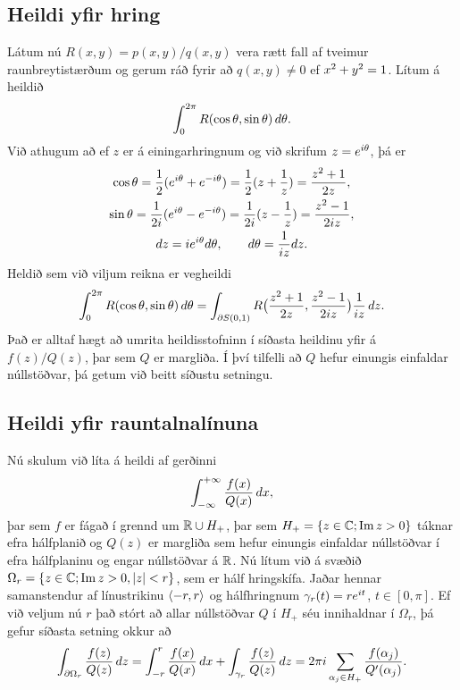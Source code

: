 \subsection*{Heildi yfir hring}

Látum nú $R(x,y)=p(x,y)/q(x,y)$ vera rætt fall af tveimur
raunbreytistærð\-um og gerum ráð fyrir að $q(x,y)\neq 0$ ef $x\sp
2+y\sp 2=1$.  Lítum á heildið 
 \begin{equation*}\int_0\sp{2\pi} R(\cos\theta,\sin \theta) \, d\theta.\label{10.2.11}
 \end{equation*}
Við athugum að ef $z$  er á einingarhringnum og við skrifum
$z=e\sp{i\theta}$, þá er 
\begin{gather*}
\cos\theta=\dfrac 12(e\sp{i\theta}+e\sp{-i\theta})
=\dfrac12(z+\dfrac 1z)=\dfrac{z\sp 2+1}{2z},\label{10.2.12}\\ 
\sin\theta=\dfrac 1{2i}(e\sp{i\theta}-e\sp{-i\theta})
=\dfrac1{2i}(z-\dfrac 1z)=\dfrac{z\sp 2-1}{2iz},\label{10.2.13}\\ 
dz=ie\sp{i\theta}d\theta, \qquad d\theta=\dfrac 1{iz}dz.\label{10.2.14}
\end{gather*}
Heldið sem við viljum reikna er vegheildi
$$
\int_0\sp {2\pi}R(\cos\theta,\sin
\theta)\, d\theta =
\int_{\partial S(0,1)}R\big(\dfrac{z\sp 2+1}{2z},\dfrac{z\sp 2-1}{2iz}\big)
\dfrac 1{iz}\, dz.
$$
Það er alltaf hægt að umrita heildisstofninn í síðasta heildinu yfir
á $f(z)/Q(z)$, þar sem $Q$ er margliða. Í því tilfelli að $Q$ hefur 
einungis einfaldar núllstöðvar, þá getum við beitt síðustu  setningu.


\subsection*{Heildi yfir rauntalnalínuna}


Nú skulum við líta á heildi af gerðinni 
 $$\int_{-\infty}\sp{+\infty}\dfrac{f(x)}{Q(x)}\, dx,
 $$
þar sem $f$ er fágað í grennd um ${\mathbb R}\cup H_+$, þar sem $H_+={\{z\in
{\mathbb C}; {\operatorname{Im\, }} z>0\}}$ táknar efra hálfplanið og $Q(z)$ er margliða sem hefur
einungis einfaldar núllstöðvar í efra hálfplaninu og engar
núllstöðvar á ${\mathbb R}$.  Nú lítum við á svæðið
$\Omega_r={\{z\in {\mathbb C}; {\operatorname{Im\, }} z>0, |z|<r\}}$, sem er hálf hringskífa.
Jaðar hennar samanstendur af línustrikinu ${\langle-r,r\rangle}$ og
hálfhringnum $\gamma_r(t)=re\sp{it}$, $t\in [0,\pi]$. Ef við veljum nú
$r$ það stórt að allar núllstöðvar $Q$ í $H_+$ séu 
innihaldnar í $\Omega_r$, þá gefur
síðasta setning okkur að 
 $$
\int_{\partial\Omega_r} \dfrac {f(z)}{Q(z)}\, dz
=\int_{-r}\sp r \dfrac {f(x)}{Q(x)}\, dx +
\int_{\gamma_r}\dfrac{f(z)}{Q(z)}\, dz = 
2\pi i\sum_{\alpha_j\in H_+} \dfrac{f(\alpha_j)}{Q{\sp{\prime}}(\alpha_j)}.
 $$

